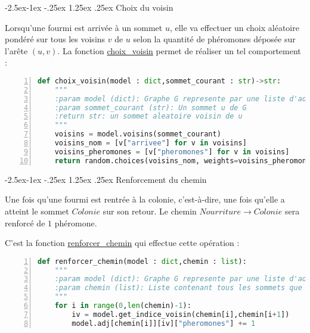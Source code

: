 \documentclass[
12pt,
french,
]{article}
\makeatletter
\renewcommand\paragraph{\@startsection{paragraph}{4}{\z@}%
        {-2.5ex\@plus -1ex \@minus -.25ex}%
        {1.25ex \@plus .25ex}%
        {\normalfont\normalsize\bfseries}}
\makeatother
\begin{document}
\hypertarget{choix-du-voisin}{%
\paragraph{Choix du voisin}\label{choix-du-voisin}}

Lorsqu'une fourmi est arrivée à un sommet \(u\), elle va effectuer un
choix aléatoire pondéré sur tous les voisins \(v\) de \(u\) selon la
quantité de phéromones déposée sur l'arête \((u,v)\). La fonction
\protect\hyperlink{choix_voisin}{choix\_voisin} permet de réaliser un
tel comportement :

\begin{lstlisting}[language=Python, numbers=left, caption={Choix du voisin}]
def choix_voisin(model : dict,sommet_courant : str)->str:
    """
    :param model (dict): Graphe G represente par une liste d'adjacence
    :param sommet_courant (str): Un sommet u de G
    :return str: un sommet aleatoire voisin de u
    """
    voisins = model.voisins(sommet_courant)
    voisins_nom = [v["arrivee"] for v in voisins]
    voisins_pheromones = [v["pheromones"] for v in voisins]
    return random.choices(voisins_nom, weights=voisins_pheromones, k=len(voisins_pheromones))[0]
\end{lstlisting}

\hypertarget{renforcement-du-chemin}{%
\paragraph{Renforcement du chemin}\label{renforcement-du-chemin}}

Une fois qu'une fourmi est rentrée à la colonie, c'est-à-dire, une fois
qu'elle a atteint le sommet \(Colonie\) sur son retour. Le chemin
\(Nourriture \rightarrow Colonie\) sera renforcé de \(1\) phéromone.

C'est la fonction
\protect\hyperlink{renforcer_chemin}{renforcer\_chemin} qui effectue
cette opération :

\begin{lstlisting}[language=Python, numbers=left, caption={Renforcement du chemin}]
def renforcer_chemin(model : dict,chemin : list):
    """
    :param model (dict): Graphe G represente par une liste d'adjacence
    :param chemin (list): Liste contenant tous les sommets que la fourmi a traverse
    """
    for i in range(0,len(chemin)-1):
        iv = model.get_indice_voisin(chemin[i],chemin[i+1])
        model.adj[chemin[i]][iv]["pheromones"] += 1
\end{lstlisting}
\end{document}
